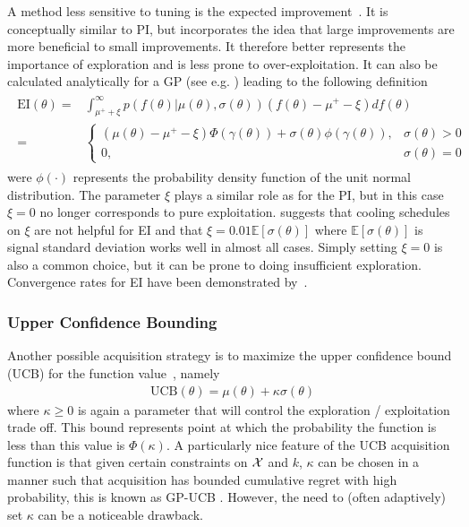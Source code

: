 A method less sensitive to tuning is the expected improvement~\citep{movckus1975bayesian}.  
It is conceptually similar to PI, but incorporates the idea that large improvements are more beneficial
to small improvements. It therefore better represents the importance of exploration and
is less prone to over-exploitation.
It can also be calculated analytically for a GP (see e.g. \cite{brochu2010tutorial}) leading to
the following definition
\begin{align}
\label{eq:opt:EI}
\begin{split}
\mathrm{EI} \left(\theta\right) = & \int_{\mu^+ +\xi}^{\infty} p\left(f\left(\theta\right)|\mu\left(\theta\right),\sigma\left(\theta\right)\right) \left(f\left(\theta\right)-\mu^+-\xi\right) df\left(\theta\right) \\
= & \begin{cases}
\left(\mu\left(\theta\right)-\mu^+-\xi\right)\Phi \left(\gamma\left(\theta\right)\right)+\sigma\left(\theta\right)\phi\left(\gamma\left(\theta\right)\right), & \sigma \left(\theta\right) > 0 \\
0, & \sigma \left(\theta\right) = 0
\end{cases}
\end{split}
\end{align}
were $\phi \left(\cdot\right)$ represents the probability density function of the unit normal distribution.  
The parameter $\xi$ plays a similar role as for the PI, but in this case $\xi=0$ no longer corresponds 
to pure exploitation.  \cite{lizotte2008practical} suggests that cooling schedules on $\xi$ are 
not helpful for EI and that $\xi = 0.01 \mathbb{E} \left[\sigma \left(\theta\right)\right]$ where 
$\mathbb{E} \left[\sigma \left(\theta\right)\right]$ is signal standard deviation works well in almost all cases.
Simply setting $\xi=0$ is also a common choice, but it can be prone to doing insufficient exploration.
Convergence rates for EI have been demonstrated by~\cite{bull2011convergence}.

\subsubsection{Upper Confidence Bounding}
\label{sec:opt:BO:acq:ucb}

Another possible acquisition strategy is to maximize the upper confidence bound (UCB) for
the function value~\citep{lai1985asymptotically,srinivas2009gaussian}, namely
\begin{align}
\label{eq:UCB}
\mathrm{UCB}\left(\theta\right) = \mu \left(\theta\right) + \kappa \sigma \left(\theta\right)
\end{align}
where $\kappa \ge 0$ is again a parameter that will control the exploration / exploitation trade off.
This bound represents point at which the probability the function is less than this value is $\Phi (\kappa)$.
A particularly nice feature of the UCB acquisition function is that given certain constraints on 
$\mathcal{X}$ and $k$, $\kappa$ can be chosen in a manner such that acquisition has bounded 
cumulative regret with high probability, this is known as GP-UCB \citep{srinivas2009gaussian}. 
However, the need to (often adaptively) set $\kappa$ can be a noticeable drawback.

